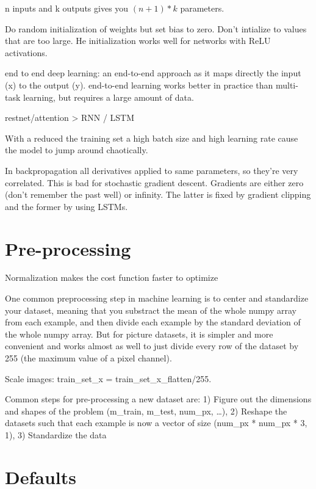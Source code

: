 \documentclass[]{book}
\begin{document}
n inputs and k outputs gives you \((n+1)*k\) parameters.

Do random initialization of weights but set bias to zero. Don't intialize to values that are too large. He initialization works well for networks with ReLU activations.

end to end deep learning: an end-to-end approach as it maps directly the input (x) to the output (y). end-to-end learning works better in practice than multi-task learning, but requires a large amount of data.

restnet/attention \textgreater{} RNN / LSTM

With a reduced the training set a high batch size and high learning rate cause the model to jump around chaotically.

In backpropagation all derivatives applied to same parameters, so they're very correlated. This is bad for stochastic gradient descent. Gradients are either zero (don't remember the past well) or infinity. The latter is fixed by gradient clipping and the former by using LSTMs.

\hypertarget{pre-processing-1}{%
\section{Pre-processing}\label{pre-processing-1}}

Normalization makes the cost function faster to optimize

One common preprocessing step in machine learning is to center and standardize your dataset, meaning that you substract the mean of the whole numpy array from each example, and then divide each example by the standard deviation of the whole numpy array. But for picture datasets, it is simpler and more convenient and works almost as well to just divide every row of the dataset by 255 (the maximum value of a pixel channel).

Scale images: train\_set\_x = train\_set\_x\_flatten/255.

Common steps for pre-processing a new dataset are: 1) Figure out the dimensions and shapes of the problem (m\_train, m\_test, num\_px, \ldots{}), 2) Reshape the datasets such that each example is now a vector of size (num\_px * num\_px * 3, 1), 3) Standardize the data

\hypertarget{defaults}{%
\section{Defaults}\label{defaults}}
\end{document}
